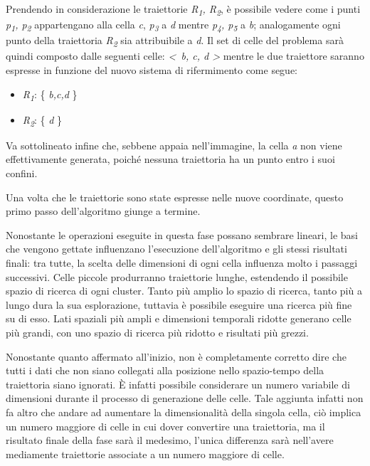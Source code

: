Prendendo in considerazione le traiettorie \textit{R\textsubscript{1}, R\textsubscript{2}}, è possibile vedere come i punti \textit{p\textsubscript{1}, p\textsubscript{2}} appartengano alla cella \textit{c},
\textit{p\textsubscript{3}} a \textit{d} mentre \textit{p\textsubscript{4}, p\textsubscript{5}} a \textit{b}; analogamente ogni punto della traiettoria \textit{R\textsubscript{2}} sia attribuibile a \textit{d}.
Il set di celle del problema sarà quindi composto dalle seguenti celle: \textit{\textless~b, c, d \textgreater} mentre le due traiettore saranno espresse in funzione del nuovo sistema di rifermimento come segue:

\begin{itemize}

  \item \textit{R\textsubscript{1}}: \{ \textit{b,c,d} \}
  \item \textit{R\textsubscript{2}}: \{ \textit{d} \}

\end{itemize}

Va sottolineato infine che, sebbene appaia nell'immagine, la cella \textit{a} non viene effettivamente generata, poiché nessuna traiettoria ha un punto entro i suoi confini.

Una volta che le traiettorie sono state espresse nelle nuove coordinate, questo primo passo dell'algoritmo giunge a termine.

Nonostante le operazioni eseguite in questa fase possano sembrare lineari, le basi che vengono gettate influenzano l'esecuzione dell'algoritmo e gli stessi risultati finali:
tra tutte, la scelta delle dimensioni di ogni cella influenza molto i passaggi successivi. Celle piccole produrranno traiettorie lunghe, estendendo il possibile spazio di ricerca di ogni cluster.
Tanto più amplio lo spazio di ricerca, tanto più a lungo dura la sua esplorazione, tuttavia è possibile eseguire una ricerca più fine su di esso.
Lati spaziali più ampli e dimensioni temporali ridotte generano celle più grandi, con uno spazio di ricerca più ridotto e risultati più grezzi.

Nonostante quanto affermato all'inizio, non è completamente corretto dire che tutti i dati che non siano collegati alla posizione nello spazio-tempo della traiettoria siano ignorati.
È infatti possibile considerare un numero variabile di dimensioni durante il processo di generazione delle celle. Tale aggiunta infatti non fa altro che andare ad aumentare la dimensionalità della singola cella,
ciò implica un numero maggiore di celle in cui dover convertire una traiettoria, ma il risultato finale della fase sarà il medesimo, l'unica differenza sarà nell'avere mediamente traiettorie
associate a un numero maggiore di celle.

